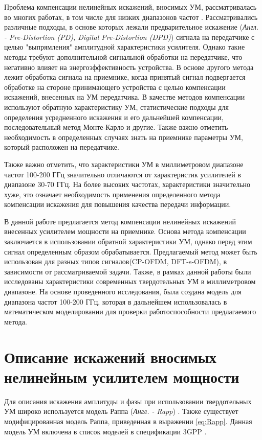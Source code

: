 \documentclass{unn}
\begin{document}
Проблема компенсации нелинейных искажений, вносимых УМ, рассматривалась во
многих работах, в том числе для низких диапазонов частот
\cite[]{sharath2015,shabany2008,eda2001,maltsev2021,bhat2016,qi2010,gregorio2007}.
Рассматривались различные подходы, в основе которых лежали предварительное
искажение (\textit{Англ. - Pre-Distortion (PD), Digital Pre-Distortion
(DPD)}) сигнала на передатчике с целью "выпрямления" амплитудной
характеристики усилителя. Однако такие методы требуют дополнительной
сигнальной обработки на передатчике, что негативно влияет на
энергоэффективность устройства. В основе другого метода лежит обработка
сигнала на приемнике, когда принятый сигнал подвергается обработке на
стороне принимающего устройства с целью компенсации искажений, внесенных на
УМ передатчика. В качестве методов компенсации используют обратную
характеристику УМ, статистические подходы для определения усредненного
искажения и его дальнейшей компенсации, последовательный метод Монте-Карло
и другие. Также важно отметить необходимость в определенных случаях знать
на приемнике параметры УМ, который расположен на передатчике.

Также важно отметить, что характеристики УМ в миллиметровом диапазоне
частот 100-200 ГГц значительно отличаются от характеристик усилителей в
диапазоне 30-70 ГГц. На более высоких частотах, характеристики значительно
хуже, это означает необходимость применения определенного метода
компенсации искажения для повышения качества передачи информации.

В данной работе предлагается метод компенсации нелинейных искажений
внесенных усилителем мощности на приемнике. Основа метода компенсации
заключается в использовании обратной характеристики УМ, однако перед этим
сигнал определенным образом обрабатывается. Предлагаемый метод может быть
использован для разных типов сигналов(CP-OFDM, DFT-s-OFDM),
в зависимости от рассматриваемой задачи. Также, в рамках данной работы были
исследованы характеристики современных твердотельных УМ в миллиметровом диапазоне. На
основе проведенного исследования, была создана модель для диапазона
частот 100-200 ГГц, которая в дальнейшем использовалась в математическом
моделировании для проверки работоспособности предлагаемого метода.



\section{Описание искажений вносимых нелинейным усилителем мощности}
Для описания искажения амплитуды и фазы при использовании твердотельных УМ
широко используется модель Раппа (\textit{Англ. - Rapp}) \cite{Rapp1991} \cite{Maltsev2010}.
Также существует модифицированная модель Раппа, приведенная в выражении
\ref{eq:Rapp}. Данная модель УМ включена в список моделей в спецификации
3GPP \cite{3gpp.38.803}.
\end{document}
